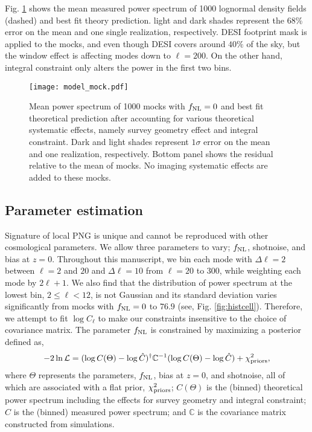 Fig. \ref{fig:model_mock} shows the mean measured power spectrum of 1000 lognormal density fields (dashed) and best fit theory prediction. light and dark shades represent the 68\% error on the mean and one single realization, respectively. DESI footprint mask is applied to the mocks, and even though DESI covers around $40\%$ of the sky, but the window effect is affecting modes down to $\ell=200$. On the other hand, integral constraint only alters the power in the first two bins. 

\begin{figure}
\centering
\texttt{[image: model\_mock.pdf]}
\caption{Mean power spectrum of 1000 mocks with $f_{\rm NL}=0$ and best fit theoretical prediction after accounting for various theoretical systematic effects, namely survey geometry effect and integral constraint. Dark and light shades represent $1\sigma$ error on the mean and one realization, respectively. Bottom panel shows the residual relative to the mean of mocks. No imaging systematic effects are added to these mocks.}\label{fig:model_mock}
\end{figure}


\subsection{Parameter estimation}
Signature of local PNG is unique and cannot be reproduced with other cosmological parameters. We allow three parameters to vary; $f_{\rm NL}$, shotnoise, and bias at $z=0$. Throughout this manuscript, we bin each mode with $\Delta\ell=2$ between $\ell=2$ and $20$ and $\Delta \ell=10$ from $\ell=20$ to $300$, while weighting each mode by $2\ell+1$. We also find that the distribution of power spectrum at the lowest bin, $2\leq \ell < 12$,  is not Gaussian and its standard deviation varies significantly from mocks with $f_{\rm NL}=0$ to $76.9$ (see, Fig. \ref{fig:histcell}). Therefore, we attempt to fit $\log C_{\ell}$ to make our constraints insensitive to the choice of covariance matrix. The parameter $f_{\rm NL}$ is constrained by maximizing a posterior defined as,
\begin{equation}
-2\ln\mathcal{L} = (\log C(\Theta)-\log \hat{C})^{\dagger} \mathbb{C}^{-1} (\log C(\Theta)-\log \hat{C}) + \chi^{2}_{\rm priors},
\end{equation}
where $\Theta$ represents the parameters, $f_{\rm NL}$, bias at $z=0$, and shotnoise, all of which are associated with a flat prior, $\chi^{2}_{\rm priors}$; $C(\Theta)$ is the (binned) theoretical power spectrum including the effects for survey geometry and integral constraint; $\hat{C}$ is the (binned) measured power spectrum; and $\mathbb{C}$ is the covariance matrix constructed from simulations. 

